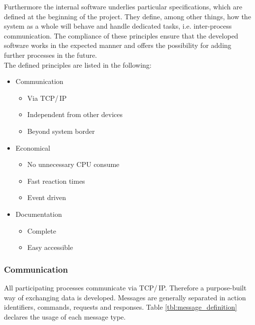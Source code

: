 Furthermore the internal software underlies particular specifications, which are defined at the beginning of the project. They define, among other things, how the system as a whole will behave and handle dedicated tasks, i.e. inter-process communication. The compliance of these principles ensure that the developed software works in the expected manner and offers the possibility for adding further processes in the future.\\

The defined principles are listed in the following:

\begin{itemize}
\itemsep0em
\item Communication
	\begin{itemize}
	\item Via TCP/\,IP
	\item Independent from other devices
	\item Beyond system border
	\end{itemize}
	
\item Economical
	\begin{itemize}
	\item No unnecessary CPU consume
	\item Fast reaction times
	\item Event driven
	\end{itemize}
	
\item Documentation
	\begin{itemize}
	\item Complete
	\item Easy accessible
	\end{itemize}
\end{itemize}

\subsubsection{Communication}

All participating processes communicate via TCP/\,IP. Therefore a purpose-built way of exchanging data is developed. Messages are generally separated in action identifiers, commands, requests and responses. Table \ref{tbl:message_definition} declares the usage of each message type.

